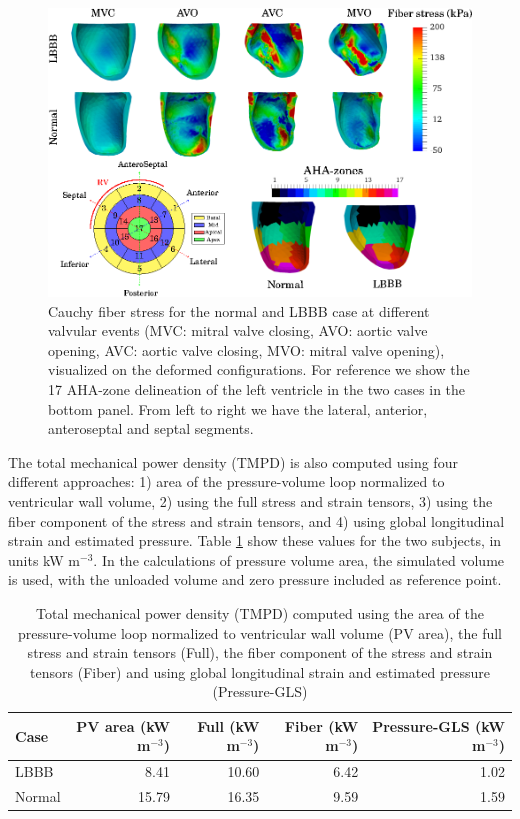 \begin{figure}[htbp]
  \centering
  \includegraphics{figures/snap_shots}
  \caption{\label{paper4:fig:snap_shots}Cauchy fiber stress for the normal and LBBB case at
    different valvular events (MVC: mitral valve closing, AVO: aortic
    valve opening, AVC: aortic valve closing, MVO: mitral valve
    opening), visualized on the deformed configurations. For reference
    we show the 17 AHA-zone delineation of the left ventricle in the
    two cases in the bottom panel. From left to right we have the
    lateral, anterior, anteroseptal and septal segments. }
\end{figure}




The total mechanical power density (TMPD) is also computed using four
different approaches: 1) area of the pressure-volume loop normalized
to ventricular wall volume, 2) using the full stress and strain tensors,
3) using the fiber component of the stress and strain tensors, and 4)
using global longitudinal strain and estimated pressure. Table
\ref{paper4:tab:total_mechanical_power} show these values for the two
subjects, in units kW m$^{-3}$. In the calculations of pressure volume
area, the simulated volume is used, with the unloaded volume and zero
pressure included as reference point.

\begin{table}
\caption{Total mechanical power density (TMPD) computed using the area
  of the pressure-volume loop normalized to ventricular wall volume
  (PV area), the full stress and strain tensors (Full), the fiber
  component of the stress and strain tensors (Fiber) and using global
  longitudinal strain and estimated pressure (Pressure-GLS)} 
\begin{tabular}{lrrrr}
\hline
 Case   &   PV area (kW m$^{-3}$) &   Full (kW m$^{-3}$) &   Fiber (kW m$^{-3}$) &   Pressure-GLS (kW m$^{-3}$) \\
\hline
 LBBB   &                    8.41 &                10.60 &                  6.42 &                         1.02 \\
 Normal &                   15.79 &                16.35 &                  9.59 &                         1.59 \\
\hline
\end{tabular}
\label{paper4:tab:total_mechanical_power}
\end{table}

